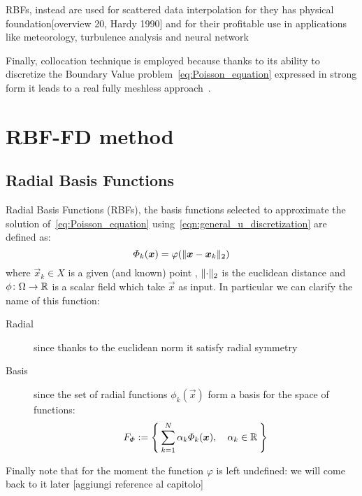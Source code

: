 RBFs, instead are used for scattered data interpolation for they has physical foundation[overview 20, Hardy 1990] and for their profitable use in applications like meteorology, turbulence analysis and neural network~\cite{Chen:meshless_overview_after_20_years}

Finally, collocation technique is employed because thanks to its ability to discretize the Boundary Value problem~\eqref{eq:Poisson_equation} expressed in strong form it leads to a real fully meshless approach~\cite{Miotti:RBF_in_depth}.

\section{RBF-FD method}

\subsection{Radial Basis Functions} \label{subsec:radial_basis_functions}
Radial Basis Functions (RBFs), the basis functions selected to approximate the solution of~\eqref{eq:Poisson_equation} using~\eqref{eqn:general_u_discretization} are defined as:
\begin{equation}
	\label{eq:RBF_definition}
	\varPhi_k(\boldsymbol{x}) = \varphi(\lVert\boldsymbol{x} - \boldsymbol{x}_k\rVert_2)
\end{equation}
where $\vec{x}_k \in X$ is a given (and known) point , $\lVert\cdot\rVert_2$ is the euclidean distance and $\phi\colon \Omega \to \mathbb{R}$ is a scalar field which take $\vec{x}$ as input. In particular we can clarify the name of this function:
\begin{description}
	\item[Radial] since thanks to the euclidean norm it satisfy radial symmetry
	\item[Basis] since the set of radial functions $\phi_k{(\vec{x})}$ form a basis for the space of functions:
	\[
		F_{\varPhi} := \Set{ \sum_{k=1}^{N} \alpha_k \varPhi_k{(\boldsymbol{x})},  \quad \alpha_k \in\mathbb{R}}
	\]
\end{description}
Finally note that for the moment the function $\varphi$ is left undefined: we will come back to it later [aggiungi reference al capitolo]

